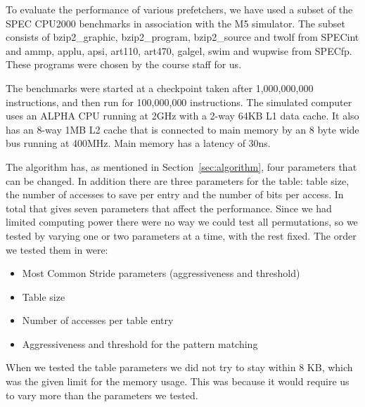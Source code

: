 To evaluate the performance of various prefetchers, we have used
a subset of the SPEC CPU2000 benchmarks in association with the M5
simulator. The subset consists of bzip2\_graphic, bzip2\_program, bzip2\_source and twolf from
SPECint and ammp, applu, apsi, art110, art470, galgel, swim and wupwise from SPECfp.
These programs were chosen by the course staff for us.

The benchmarks were started at a checkpoint taken after
1,000,000,000 instructions, and then run for 100,000,000 instructions.
The simulated computer uses an ALPHA CPU running at 2GHz
with a 2-way 64KB L1 data cache. It also has an 8-way 1MB L2 cache that is
connected to main memory by an 8 byte wide bus running at
400MHz. Main memory has a latency of 30ns.

The algorithm has, as mentioned in Section~\ref{sec:algorithm}, four parameters that can be changed. In addition there are
three parameters for the table: table size, the number of accesses to save per
entry and the number of bits per access. In total that gives seven parameters
that affect the performance. Since we had limited computing power there were no
way we could test all permutations, so we tested by varying one or two
parameters at a time, with the rest fixed. The order we tested them in were:

\begin{itemize}
	\item Most Common Stride parameters (aggressiveness and threshold)
	\item Table size
	\item Number of accesses per table entry
	\item Aggressiveness and threshold for the pattern matching
\end{itemize}

When we tested the table parameters we did not try to stay within 8 KB, which
was the given limit for the memory usage. This was because it would require us to
vary more than the parameters we tested.
